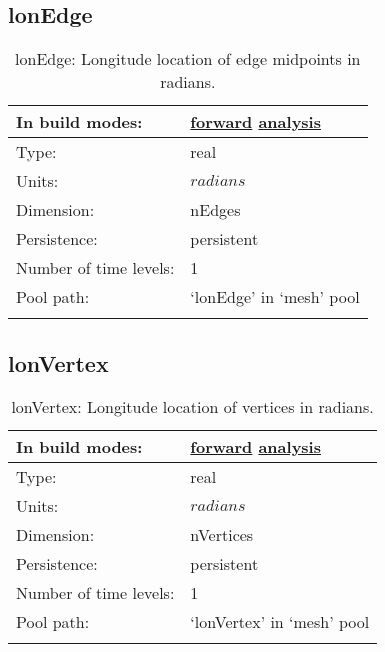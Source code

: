 \subsection[lonEdge]{lonEdge}
\label{subsec:var_sec_mesh_lonEdge}
\begin{center}
\begin{longtable}{| p{2.0in} | p{4.0in} |}
        \hline 
        In build modes: & \hyperref[subsec:forward_var_tab_mesh]{forward} \hyperref[subsec:analysis_var_tab_mesh]{analysis} \\
        \hline 
        Type: & real \\
        \hline 
        Units: & $radians$ \\
        \hline 
        Dimension: & nEdges \\
        \hline 
        Persistence: & persistent \\
        \hline 
        Number of time levels: & 1 \\
        \hline 
            Pool path: & `lonEdge' in `mesh' pool \\
		 \hline 
    \caption{lonEdge: Longitude location of edge midpoints in radians.}
\end{longtable}
\end{center}
\subsection[lonVertex]{lonVertex}
\label{subsec:var_sec_mesh_lonVertex}
\begin{center}
\begin{longtable}{| p{2.0in} | p{4.0in} |}
        \hline 
        In build modes: & \hyperref[subsec:forward_var_tab_mesh]{forward} \hyperref[subsec:analysis_var_tab_mesh]{analysis} \\
        \hline 
        Type: & real \\
        \hline 
        Units: & $radians$ \\
        \hline 
        Dimension: & nVertices \\
        \hline 
        Persistence: & persistent \\
        \hline 
        Number of time levels: & 1 \\
        \hline 
            Pool path: & `lonVertex' in `mesh' pool \\
		 \hline 
    \caption{lonVertex: Longitude location of vertices in radians.}
\end{longtable}
\end{center}
